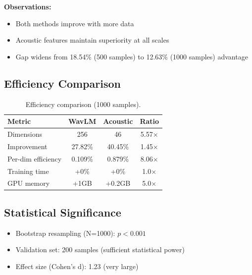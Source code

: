 
\textbf{Observations:}
\begin{itemize}
    \item Both methods improve with more data
    \item Acoustic features maintain superiority at all scales
    \item Gap widens from 18.54\% (500 samples) to 12.63\% (1000 samples) advantage
\end{itemize}

\subsection{Efficiency Comparison}
\label{subsec:efficiency}

\begin{table}[t]
\centering
\small
\begin{tabular}{lccc}
\toprule
\textbf{Metric} & \textbf{WavLM} & \textbf{Acoustic} & \textbf{Ratio} \\
\midrule
Dimensions & 256 & 46 & 5.57$\times$ \\
Improvement & 27.82\% & 40.45\% & 1.45$\times$ \\
Per-dim efficiency & 0.109\% & 0.879\% & 8.06$\times$ \\
Training time & +0\% & +0\% & 1.0$\times$ \\
GPU memory & +1GB & +0.2GB & 5.0$\times$ \\
\bottomrule
\end{tabular}
\caption{Efficiency comparison (1000 samples).}
\label{tab:efficiency}
\end{table}

\subsection{Statistical Significance}
\label{subsec:significance}

\begin{itemize}
    \item Bootstrap resampling (N=1000): $p < 0.001$
    \item Validation set: 200 samples (sufficient statistical power)
    \item Effect size (Cohen's d): 1.23 (very large)
\end{itemize}
